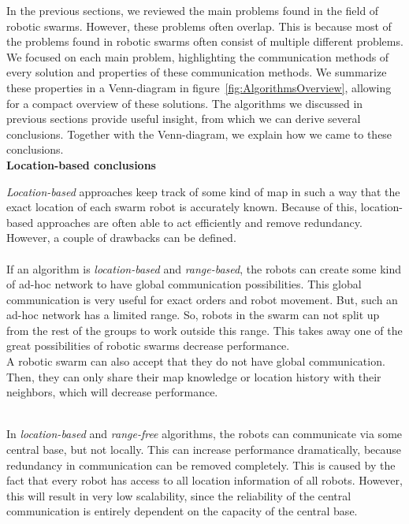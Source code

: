 

In the previous sections, we reviewed the main problems found in the field of robotic swarms. 
However, these problems often overlap.
This is because most of the problems found in robotic swarms often consist of multiple different problems. 
We focused on each main problem, highlighting the communication methods of every solution and properties of these communication methods. 
We summarize these properties in a Venn-diagram in figure~\ref{fig:AlgorithmsOverview}, allowing for a compact overview of these solutions.
The algorithms we discussed in previous sections provide useful insight, from which we can derive several conclusions.
Together with the Venn-diagram, we explain how we came to these conclusions. \\

\textbf{Location-based conclusions} 

\emph{Location-based} approaches keep track of some kind of map in such a way that the exact location of each swarm robot is accurately known.
Because of this, location-based approaches are often able to act efficiently and remove redundancy.
However, a couple of drawbacks can be defined.\\
\\
If an algorithm is \emph{location-based} and \emph{range-based}, the robots can create some kind of ad-hoc network to have global communication possibilities.
This global communication is very useful for exact orders and robot movement. 
But, such an ad-hoc network has a limited range. 
So, robots in the swarm can not split up from the rest of the groups to work outside this range. 
This takes away one of the great possibilities of robotic swarms decrease performance. \\
A robotic swarm can also accept that they do not have global communication.
Then, they can only share their map knowledge or location history with their neighbors, which will decrease performance. 

\\
In \emph{location-based} and \emph{range-free} algorithms, the robots can communicate via some central base, but not locally. 
This can increase performance dramatically, because redundancy in communication can be removed completely.
This is caused by the fact that every robot has access to all location information of all robots.
However, this will result in very low scalability, since the reliability of the central communication is entirely dependent on the capacity of the central base.

